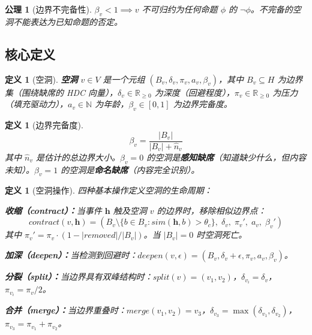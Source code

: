 \documentclass[11pt]{article}
\newtheorem{definition}[theorem]{定义}
\newtheorem{axiom}{公理}[section]
\begin{document}
\begin{axiom}[边界不完备性]
\label{ax:void-incomplete}
$\beta_v < 1 \implies v$ 不可归约为任何命题 $\phi$ 的 $\neg\phi$。不完备的空洞不能表达为已知命题的否定。
\end{axiom}

\subsection{核心定义}

\begin{definition}[空洞]
\label{def:void}
\textbf{空洞} $v \in V$ 是一个元组 $(B_v, \delta_v, \pi_v, a_v, \beta_v)$，其中 $B_v \subseteq H$ 为边界集（围绕缺席的 HDC 向量），$\delta_v \in \mathbb{R}_{\geq 0}$ 为深度（回避程度），$\pi_v \in \mathbb{R}_{\geq 0}$ 为压力（填充驱动力），$a_v \in \mathbb{N}$ 为年龄，$\beta_v \in [0,1]$ 为边界完备度。
\end{definition}

\begin{definition}[边界完备度]
\label{def:beta}
\begin{equation}
\beta_v = \frac{|B_v|}{|B_v| + \hat{n}_v}
\end{equation}
其中 $\hat{n}_v$ 是估计的总边界大小。$\beta_v = 0$ 的空洞是\textbf{感知缺席}（知道缺少什么，但内容未知）。$\beta_v = 1$ 的空洞是\textbf{命名缺席}（内容完全识别）。
\end{definition}

\begin{definition}[空洞操作]
\label{def:void-ops}
四种基本操作定义空洞的生命周期：

\textbf{收缩（contract）：}当事件 $\mathbf{h}$ 触及空洞 $v$ 的边界时，移除相似边界点：
\begin{equation}
contract(v, \mathbf{h}) = (B_v \setminus \{b \in B_v : sim(\mathbf{h}, b) > \theta_c\},\; \delta_v,\; \pi_v',\; a_v,\; \beta_v')
\end{equation}
其中 $\pi_v' = \pi_v \cdot (1 - |removed|/|B_v|)$。当 $|B_v| = 0$ 时空洞死亡。

\textbf{加深（deepen）：}当检测到回避时：$deepen(v, \epsilon) = (B_v, \delta_v + \epsilon, \pi_v, a_v, \beta_v)$。

\textbf{分裂（split）：}当边界具有双峰结构时：$split(v) = (v_1, v_2)$，$\delta_{v_i} = \delta_v$，$\pi_{v_i} = \pi_v/2$。

\textbf{合并（merge）：}当边界重叠时：$merge(v_1, v_2) = v_3$，$\delta_{v_3} = \max(\delta_{v_1}, \delta_{v_2})$，$\pi_{v_3} = \pi_{v_1} + \pi_{v_2}$。
\end{definition}
\end{document}
